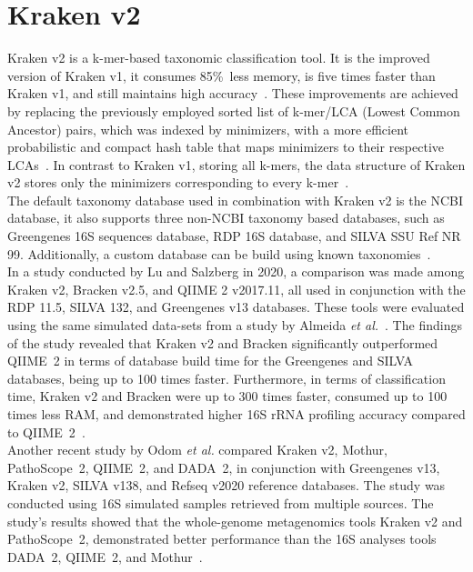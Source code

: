 \section{Kraken v2}\label{sec:Kraken}
Kraken v2 is a k-mer-based taxonomic classification tool. It is the improved version of Kraken v1, it consumes 85\%\ less memory, is five times faster than Kraken v1, and still maintains high accuracy~\cite{wood_improved_2019}. These improvements are achieved by replacing the previously employed sorted list of k-mer/LCA (Lowest Common Ancestor) pairs, which was indexed by minimizers, with a more efficient probabilistic and compact hash table that maps minimizers to their respective LCAs~\cite{wood_improved_2019}. In contrast to Kraken v1, storing all k-mers, the data structure of Kraken v2 stores only the minimizers corresponding to every k-mer~\cite{wood_improved_2019}.
\\
The default taxonomy database used in combination with Kraken v2 is the NCBI database, it also supports three non-NCBI taxonomy based databases, such as Greengenes 16S sequences database, RDP 16S database, and SILVA SSU Ref NR 99. Additionally, a custom database can be build using known taxonomies~\cite{noauthor_kraken2docsmanualmarkdown_nodate}.
\\
In a study conducted by Lu and Salzberg in 2020, a comparison was made among Kraken v2, Bracken v2.5, and QIIME 2 v2017.11, all used in conjunction with the RDP 11.5, SILVA 132, and Greengenes v13 databases. These tools were evaluated using the same simulated data-sets from a study by Almeida \emph{et al.}~\cite{almeida_benchmarking_2018}. The findings of the study revealed that Kraken v2 and Bracken significantly outperformed QIIME~2 in terms of database build time for the Greengenes and SILVA databases, being up to 100 times faster. Furthermore, in terms of classification time, Kraken v2 and Bracken were up to 300 times faster, consumed up to 100 times less RAM, and demonstrated higher 16S rRNA profiling accuracy compared to QIIME~2~\cite{lu_ultrafast_2020}.\\
Another recent study by Odom \emph{et al.} compared Kraken v2, Mothur, PathoScope~2, QIIME~2, and DADA~2, in conjunction with Greengenes v13, Kraken v2, SILVA v138, and Refseq v2020 reference databases. The study was conducted using 16S simulated samples retrieved from multiple sources. The study's results showed that the whole-genome metagenomics tools Kraken v2 and PathoScope~2, demonstrated better performance than the 16S analyses tools DADA~2, QIIME~2, and Mothur~\cite{odom_metagenomic_2023}.